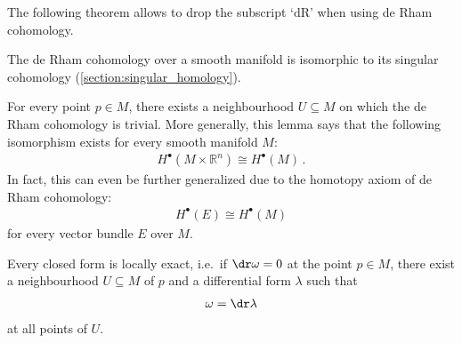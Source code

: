     The following theorem allows to drop the subscript `$\text{dR}$' when using de Rham cohomology.
    \begin{theorem}[de Rham]
        The de Rham cohomology over a smooth manifold is isomorphic to its singular cohomology (\cref{section:singular_homology}).
    \end{theorem}

    \begin{theorem}\label{bundle:poincare}
        For every point $p\in M$, there exists a neighbourhood $U\subseteq M$ on which the de Rham cohomology is trivial. More generally, this lemma says that the following isomorphism exists for every smooth manifold $M$:
        \begin{gather}
            H^\bullet(M\times\mathbb{R}^n)\cong H^\bullet(M)\,.
        \end{gather}
        In fact, this can even be further generalized due to the homotopy axiom of de Rham cohomology:
        \begin{gather}
            H^\bullet(E)\cong H^\bullet(M)
        \end{gather}
        for every vector bundle $E$ over $M$.
    \end{theorem}
    \begin{result}
        Every closed form is locally exact, i.e.~if $\dr\omega=0$ at the point $p\in M$, there exist a neighbourhood $U\subseteq M$ of $p$ and a differential form $\lambda$ such that
        \begin{gather}
            \omega=\dr\lambda
        \end{gather}
        at all points of $U$.
    \end{result}


